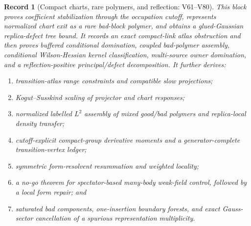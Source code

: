 \documentclass[11pt,oneside]{book}
\newtheorem{record}[theorem]{Record}
\theoremstyle{definition}
\theoremstyle{remark}
\begin{document}
\begin{record}[Compact charts, rare polymers, and reflection:
V61--V80]
\label{rec:e8v1-v61-v80}
This block proves coefficient stabilization through the occupation
cutoff, represents normalized chart exit as a rare bad-block polymer,
and obtains a glued-Gaussian replica-defect tree bound.  It records an
exact compact-link atlas obstruction and then proves buffered
conditional domination, coupled bad-polymer assembly, conditional
Wilson-Hessian kernel classification, multi-source owner domination,
and a reflection-positive principal/defect decomposition.  It further
derives:
\begin{enumerate}[label=\textup{(\roman*)},leftmargin=3.5em]
\item transition-atlas range constraints and compatible slow
      projections;
\item Kogut--Susskind scaling of projector and chart responses;
\item normalized labelled \(L^2\) assembly of mixed good/bad polymers
      and replica-local density transfer;
\item cutoff-explicit compact-group derivative moments and a
      generator-complete transition-vertex ledger;
\item symmetric form-resolvent resummation and weighted locality;
\item a no-go theorem for spectator-based many-body weak-field
      control, followed by a local form repair; and
\item saturated bad components, one-insertion boundary forests, and
      exact Gauss-sector cancellation of a spurious representation
      multiplicity.
\end{enumerate}
\end{record}
\end{document}
